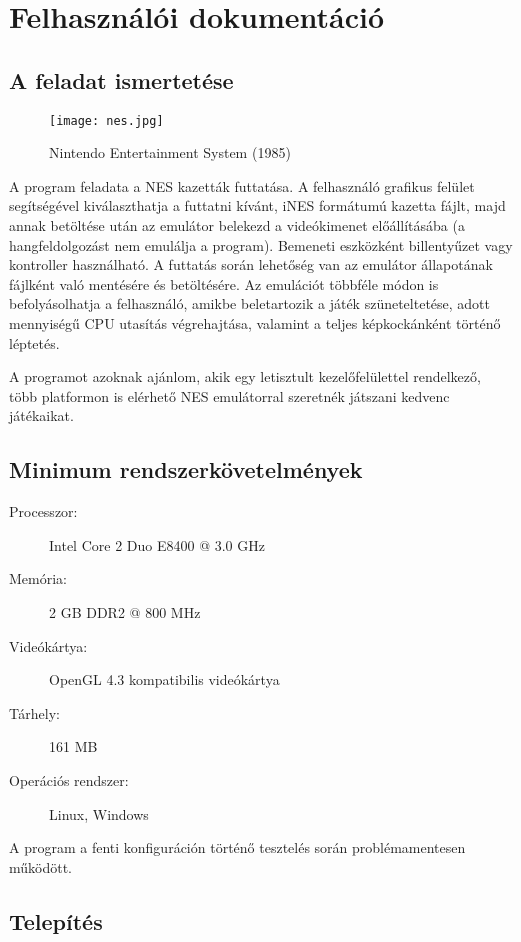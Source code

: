 \chapter{Felhasználói dokumentáció} %
\label{ch:user}

\section{A feladat ismertetése}

\begin{figure}[H]
	\centering
	\texttt{[image: nes.jpg]}
	\caption{Nintendo Entertainment System (1985)}
	\label{fig:nes}
\end{figure}

A program feladata a NES kazetták futtatása. A felhasználó grafikus felület segítségével kiválaszthatja a futtatni kívánt, iNES formátumú kazetta fájlt, majd annak betöltése után az emulátor belekezd a videókimenet előállításába (a hangfeldolgozást nem emulálja a program). Bemeneti eszközként billentyűzet vagy kontroller használható. A futtatás során lehetőség van az emulátor állapotának fájlként való mentésére és betöltésére. Az emulációt többféle módon is befolyásolhatja a felhasználó, amikbe beletartozik a játék szüneteltetése, adott mennyiségű CPU utasítás végrehajtása, valamint a teljes képkockánként történő léptetés.

A programot azoknak ajánlom, akik egy letisztult kezelőfelülettel rendelkező, több platformon is elérhető NES emulátorral szeretnék játszani kedvenc játékaikat.

\section{Minimum rendszerkövetelmények}

\begin{description}
	\item[Processzor:] Intel Core 2 Duo E8400 @ 3.0 GHz
	\item[Memória:] 2 GB DDR2 @ 800 MHz
	\item[Videókártya:] OpenGL 4.3 kompatibilis videókártya
	\item[Tárhely:] 161 MB
	\item[Operációs rendszer:] Linux, Windows
\end{description}

A program a fenti konfiguráción történő tesztelés során problémamentesen működött.

\section{Telepítés}

